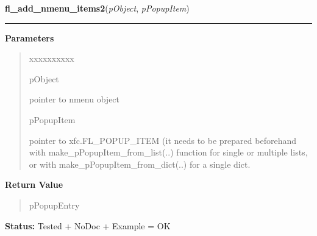     \label{xformslib:library:fl_add_nmenu_items2}

    \vspace{0.5ex}

\hspace{.8\funcindent}\begin{boxedminipage}{\funcwidth}

    \raggedright \textbf{fl\_add\_nmenu\_items2}(\textit{pObject}, \textit{pPopupItem})

    \vspace{-1.5ex}

    \rule{\textwidth}{0.5\fboxrule}
\setlength{\parskip}{2ex}
\setlength{\parskip}{1ex}
      \textbf{Parameters}
      \vspace{-1ex}

      \begin{quote}
        \begin{Ventry}{xxxxxxxxxx}

          \item[pObject]

          pointer to nmenu object

          \item[pPopupItem]

          pointer to xfc.FL\_POPUP\_ITEM (it needs to be prepared 
          beforehand with make\_pPopupItem\_from\_list(..) function for 
          single or multiple lists, or with 
          make\_pPopupItem\_from\_dict(..) for a single dict.

        \end{Ventry}

      \end{quote}

      \textbf{Return Value}
    \vspace{-1ex}

      \begin{quote}
      pPopupEntry

      \end{quote}

\textbf{Status:} Tested + NoDoc + Example = OK



    \end{boxedminipage}

    \label{xformslib:library:fl_insert_nmenu_items2}

